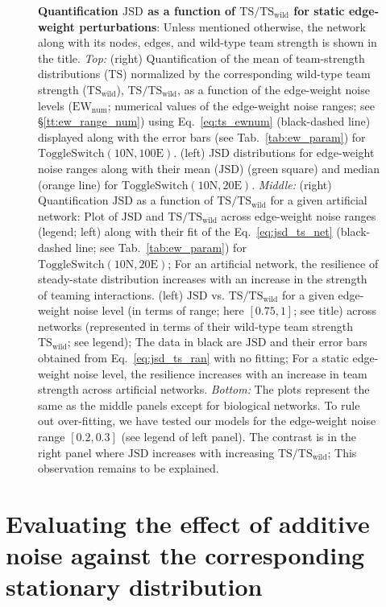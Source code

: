 \documentclass[11pt]{article}
\newcommand{\ts}{\mathrm{TS}}
\newcommand{\jsd}{\mathrm{JSD}}
\newcommand{\tsw}{\mathrm{TS_{wild}}}
\newcommand{\ewnum}{\mathrm{EW_{num}}}
\newcommand{\tsten}{\mathrm{Toggle Switch (10N,100E)}}
\newcommand{\tseight}{\mathrm{Toggle Switch (10N,20E)}}
\begin{document}
\begin{figure}
{\begin{tabular}{c c c c}
\end{tabular}
}
\caption{
\textbf{Quantification $\jsd$ as a function of $\ts/\tsw$ for static edge-weight perturbations}: Unless mentioned otherwise, the network along with its nodes, edges, and wild-type team strength is shown in the title. \textit{Top:} (right) Quantification of the mean of team-strength distributions ($\ts$) normalized by the corresponding wild-type team strength ($\tsw$), $\ts/\tsw$, as a function of the edge-weight noise levels ($\ewnum$; numerical values of the edge-weight noise ranges; see \S\ref{tt:ew_range_num}) using Eq.~\ref{eq:ts_ewnum} (black-dashed line) displayed along with the error bars (see Tab.~\ref{tab:ew_param}) for $\tsten$. (left) JSD distributions for edge-weight noise ranges along with their mean ($\jsd$) (green square) and median (orange line) for $\tseight$. \textit{Middle:} (right) Quantification $\jsd$ as a function of $\ts/\tsw$ for a given artificial network: Plot of $\jsd$ and $\ts/\tsw$ across edge-weight noise ranges (legend; left) along with their fit of the Eq.~\ref{eq:jsd_ts_net} (black-dashed line; see Tab.~\ref{tab:ew_param}) for $\tseight$; For an artificial network, the resilience of steady-state distribution increases with an increase in the strength of teaming interactions. (left) $\jsd$ vs. $\ts/\tsw$ for a given edge-weight noise level (in terms of range; here $[0.75,1]$; see title) across networks (represented in terms of their wild-type team strength $\tsw$; see legend); The data in black are $\jsd$ and their error bars obtained from Eq.~\ref{eq:jsd_ts_ran} with no fitting; For a static edge-weight noise level, the resilience increases with an increase in team strength across artificial networks. \textit{Bottom:} The plots represent the same as the middle panels except for biological networks. To rule out over-fitting, we have tested our models for the edge-weight noise range $[0.2,0.3]$ (see legend of left panel). The contrast is in the right panel where $\jsd$ increases with increasing $\ts/\tsw$; This observation remains to be explained.
}
\label{fig:S2}
\end{figure} 

\newpage

\section{Evaluating the effect of additive noise against the corresponding stationary distribution}
\end{document}
